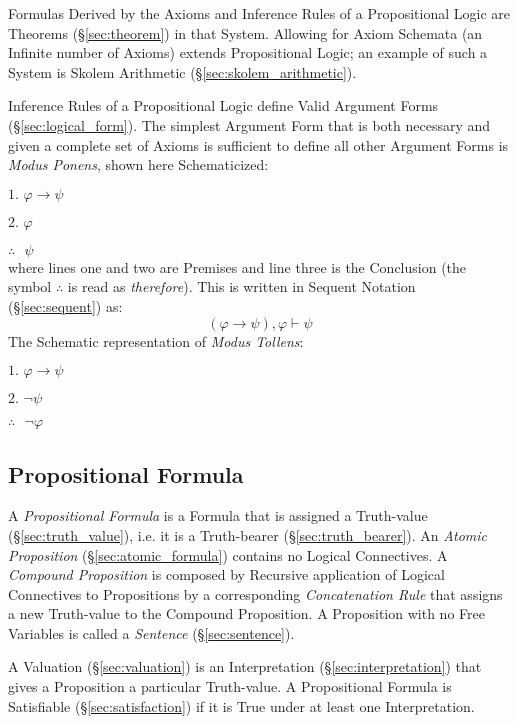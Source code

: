 Formulas Derived by the Axioms and Inference Rules of a Propositional
Logic are Theorems (\S\ref{sec:theorem}) in that System. Allowing for
Axiom Schemata (an Infinite number of Axioms) extends Propositional
Logic; an example of such a System is Skolem Arithmetic
(\S\ref{sec:skolem_arithmetic}).

Inference Rules of a Propositional Logic define Valid Argument Forms
(\S\ref{sec:logical_form}). The simplest Argument Form that is both
necessary and given a complete set of Axioms is sufficient to define
all other Argument Forms is \emph{Modus Ponens}, shown here
Schematicized:

$\textrm{1. }\varphi \rightarrow \psi$

$\textrm{2. }\varphi$

$\therefore\textrm{ }\psi$ \\
where lines one and two are Premises and line three is the Conclusion
(the symbol $\therefore$ is read as \emph{therefore}). This is written
in Sequent Notation (\S\ref{sec:sequent}) as:
\[
  (\varphi \rightarrow \psi), \varphi \vdash \psi
\]
The Schematic representation of \emph{Modus Tollens}:

$\textrm{1. }\varphi \rightarrow \psi$

$\textrm{2. }\neg\psi$

$\therefore\textrm{ }\neg\varphi$\\



\subsection{Propositional Formula}\label{sec:propositional_formula}

A \emph{Propositional Formula} is a Formula that is assigned a
Truth-value (\S\ref{sec:truth_value}), i.e. it is a Truth-bearer
(\S\ref{sec:truth_bearer}). An \emph{Atomic Proposition}
(\S\ref{sec:atomic_formula}) contains no Logical Connectives. A
\emph{Compound Proposition} is composed by Recursive application of
Logical Connectives to Propositions by a corresponding
\emph{Concatenation Rule} that assigns a new Truth-value to the
Compound Proposition. A Proposition with no Free Variables is called a
\emph{Sentence} (\S\ref{sec:sentence}).

A Valuation (\S\ref{sec:valuation}) is an Interpretation
(\S\ref{sec:interpretation}) that gives a Proposition a particular
Truth-value. A Propositional Formula is Satisfiable
(\S\ref{sec:satisfaction}) if it is True under at least one
Interpretation.



